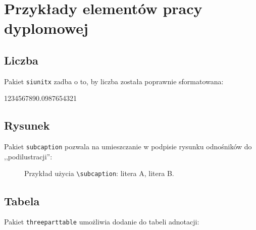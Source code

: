 \chapter{Przykłady elementów pracy dyplomowej}

\section{Liczba}

Pakiet \texttt{siunitx} zadba o to, by liczba została poprawnie sformatowana: \\
\begin{center}
        \num{1234567890.0987654321}
\end{center}


\section{Rysunek}

Pakiet \texttt{subcaption} pozwala na umieszczanie w podpisie rysunku odnośników do ,,podilustracji'': \\

\begin{figure}[h]
        \centering
        \begin{subfigure}{0.35\textwidth}
                \centering
                \subcaption{\label{subfigure_a}}
        \end{subfigure}
        \begin{subfigure}{0.35\textwidth}
                \centering
                \subcaption{\label{subfigure_b}}
        \end{subfigure}
        \label{fig:subcaption_example}
        \caption{Przykład użycia \texttt{\textbackslash subcaption}: \protect{} litera A, \protect{} litera B.}
\end{figure}

\section{Tabela}

Pakiet \texttt{threeparttable} umożliwia dodanie do tabeli adnotacji: \\

